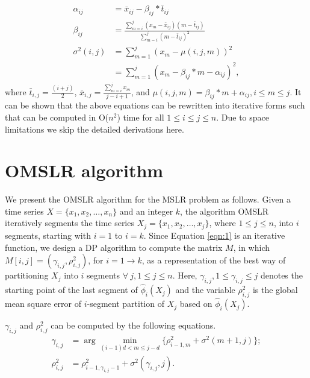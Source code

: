 \documentclass{article}
\begin{document}
\begin{equation}\label{eqn:2}
\begin{aligned}
  \alpha_{ij}
  &= 	\bar x_{ij} - \beta_{ij} * \bar t_{ij} \\
  \beta_{ij}
  &= \frac{\sum_{m=i}^{j}(x_m - \bar x_{ij})(m - \bar t_{ij})}{\sum_{m=i}^{j}(m - \bar t_{ij})^2} \\
  \sigma^2(i,j)
  &=\sum_{m=1}^{j}(x_m - \mu(i,j,m))^2\\
  &=\sum_{m=1}^{j}(x_m - \beta_{ij} * m  - \alpha_{ij})^2,
\end{aligned}
\end{equation}
where $\bar t_{i,j} = \frac{(i+j)}{2}$, $\bar x_{i,j} = \frac{\sum_{m=i}^{j} x_m}{j-i+1}$, and $\mu(i,j,m) = \beta_{ij} * m + \alpha_{ij}, i \leq m \leq j$.  It can be shown that the above equations can be rewritten into iterative forms such that can be computed in O($n^2$) time for all $1 \leq i \leq j \leq n$. Due to space limitations we skip the detailed derivations here.

\section{OMSLR algorithm}
\label{sec:OMSLR}
We present the OMSLR algorithm for the MSLR problem as follows. Given a time series $X = \{x_1, x_2,\dots,x_n\}$ and an integer $k$, the algorithm OMSLR iteratively segments the time series $X_j = \{x_1, x_2, \dots, x_j\}$, where $1 \leq j \leq n$, into $i$ segments, starting with $i=1$ to $i=k$. Since Equation \ref{eqn:1} is an iterative function, we design a DP algorithm to compute the matrix $M$, in which $M[i,j]=(\gamma_{i,j},\rho^2_{i,j})$, for $i=1 \rightarrow k$, as a representation of the best way of partitioning $X_j$ into $i$ segments $\forall~j, 1 \leq j \leq n$. Here, $\gamma_{i,j}, 1 \leq \gamma_{i,j} \leq j$ denotes the starting point of the last segment of $ \hat \phi_i(X_j)$ and the variable $\rho^2_{i,j}$ is the global mean square error of $i$-segment partition of $X_j$ based on $\hat \phi_i(X_j)$.

$\gamma_{i,j}$ and $\rho^2_{i,j}$ can be computed by the following equations.
\begin{equation}\label{eqn:3}
\begin{aligned}
  \gamma_{i,j} &= \arg \min_{(i-1)d < m \leq j-d}\{ \rho^2_{i-1,m} + \sigma^2 (m+1, j)\};\\
  \rho^2_{i,j} &= \rho^2_{i-1,\gamma_{i,j}-1} + \sigma^2 (\gamma_{i,j}, j).
\end{aligned}
\end{equation}
\end{document}
